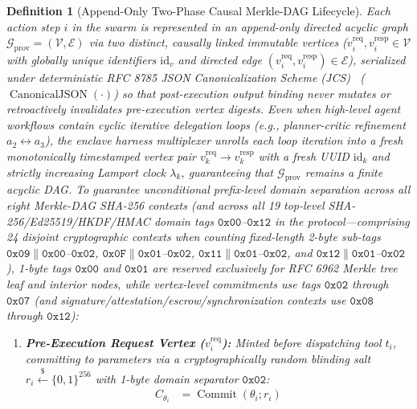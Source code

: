 \documentclass[conference,10pt]{IEEEtran}
\newtheorem{definition}{Definition}
\begin{document}
\begin{definition}[Append-Only Two-Phase Causal Merkle-DAG Lifecycle]
Each action step $i$ in the swarm is represented in an append-only directed acyclic graph $\mathcal{G}_{\text{prov}} = (\mathcal{V}, \mathcal{E})$ via two distinct, causally linked immutable vertices ($v_i^{\text{req}}, v_i^{\text{resp}} \in \mathcal{V}$ with globally unique identifiers $\text{id}_v$ and directed edge $(v_i^{\text{req}}, v_i^{\text{resp}}) \in \mathcal{E}$), serialized under deterministic RFC 8785 JSON Canonicalization Scheme (JCS)~\cite{rundgren2020rfc8785} ($\operatorname{CanonicalJSON}(\cdot)$) so that post-execution output binding never mutates or retroactively invalidates pre-execution vertex digests. Even when high-level agent workflows contain cyclic iterative delegation loops (e.g., planner-critic refinement $a_2 \leftrightarrow a_3$), the enclave harness multiplexer unrolls each loop iteration into a fresh monotonically timestamped vertex pair $v_k^{\text{req}} \to v_k^{\text{resp}}$ with a fresh UUID $\text{id}_k$ and strictly increasing Lamport clock $\lambda_k$, guaranteeing that $\mathcal{G}_{\text{prov}}$ remains a finite acyclic DAG. To guarantee unconditional prefix-level domain separation across all eight Merkle-DAG SHA-256 contexts (and across all 19 top-level SHA-256/Ed25519/HKDF/HMAC domain tags $\mathtt{0x00}$--$\mathtt{0x12}$ in the protocol---comprising 24 disjoint cryptographic contexts when counting fixed-length 2-byte sub-tags $\mathtt{0x09}\parallel\mathtt{0x00}$--$\mathtt{0x02}$, $\mathtt{0x0F}\parallel\mathtt{0x01}$--$\mathtt{0x02}$, $\mathtt{0x11}\parallel\mathtt{0x01}$--$\mathtt{0x02}$, and $\mathtt{0x12}\parallel\mathtt{0x01}$--$\mathtt{0x02}$), 1-byte tags $\mathtt{0x00}$ and $\mathtt{0x01}$ are reserved exclusively for RFC 6962 Merkle tree leaf and interior nodes, while vertex-level commitments use tags $\mathtt{0x02}$ through $\mathtt{0x07}$ (and signature/attestation/escrow/synchronization contexts use $\mathtt{0x08}$ through $\mathtt{0x12}$):
\begin{enumerate}
    \item \textbf{Pre-Execution Request Vertex ($v_i^{\text{req}}$):} Minted before dispatching tool $t_i$, committing to parameters via a cryptographically random blinding salt $r_i \xleftarrow{\$} \{0,1\}^{256}$ with 1-byte domain separator $\mathtt{0x02}$:
    \begin{equation}
    \begin{split}
    C_{\theta_i} &= \operatorname{Commit}(\theta_i; r_i) \\

\end{split}
\end{equation}
\end{enumerate}
\end{definition}
\end{document}
